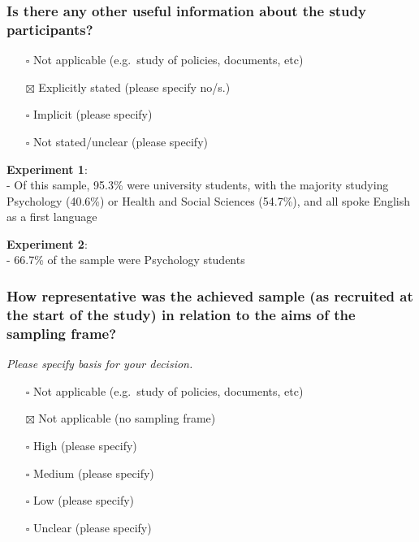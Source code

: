 \documentclass[
  doc, a4paper]{apa7}
\providecommand{\tightlist}{%
  \setlength{\itemsep}{0pt}\setlength{\parskip}{0pt}}
\begin{document}
\subsubsection{Is there any other useful information about the study participants?}\label{is-there-any-other-useful-information-about-the-study-participants}

\begin{itemize}
\tightlist
\item[$\square$]
  Not applicable (e.g.~study of policies, documents, etc)
\item[$\boxtimes$]
  Explicitly stated (please specify no/s.)
\item[$\square$]
  Implicit (please specify)
\item[$\square$]
  Not stated/unclear (please specify)
\end{itemize}

\textbf{Experiment 1}:\\
- Of this sample, 95.3\% were university students, with the majority studying Psychology (40.6\%) or Health and Social Sciences (54.7\%), and all spoke English as a first language

\textbf{Experiment 2}:\\
- 66.7\% of the sample were Psychology students

\subsubsection{How representative was the achieved sample (as recruited at the start of the study) in relation to the aims of the sampling frame?}\label{how-representative-was-the-achieved-sample-as-recruited-at-the-start-of-the-study-in-relation-to-the-aims-of-the-sampling-frame}

\emph{Please specify basis for your decision.}

\begin{itemize}
\tightlist
\item[$\square$]
  Not applicable (e.g.~study of policies, documents, etc)
\item[$\boxtimes$]
  Not applicable (no sampling frame)
\item[$\square$]
  High (please specify)
\item[$\square$]
  Medium (please specify)
\item[$\square$]
  Low (please specify)
\item[$\square$]
  Unclear (please specify)
\end{itemize}
\end{document}
